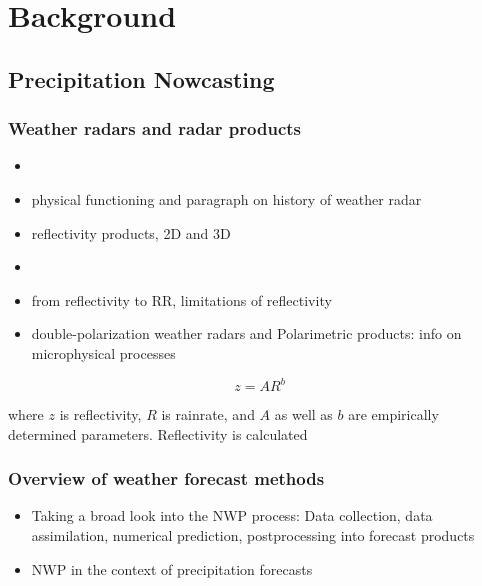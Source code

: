 \chapter{Background}
\label{chapter:background} 

\section{Precipitation Nowcasting}

\subsection{Weather radars and radar products}


\begin{itemize}
	\item {}
	\item physical functioning and paragraph on history of weather radar
	\item reflectivity products, 2D and 3D
	
	\item {}
	\item from reflectivity to RR, limitations of reflectivity
	\item double-polarization weather radars and Polarimetric products: info on microphysical processes
\end{itemize}

\begin{equation}
\label{eq:z-r}
	z = AR^b
\end{equation}

where $z$ is reflectivity, $R$ is rainrate, and $A$ as well as $b$ are empirically determined parameters. Reflectivity is calculated 

\subsection{Overview of weather forecast methods}
\begin{itemize}
	\item Taking a broad look into the NWP process: Data collection, data assimilation, numerical prediction, postprocessing into forecast products
	\item NWP in the context of precipitation forecasts
\end{itemize}


